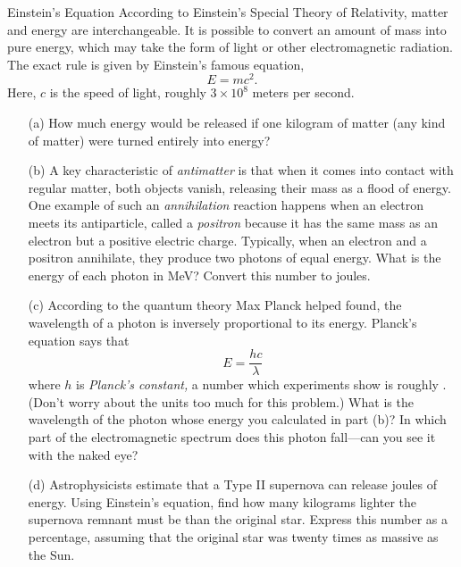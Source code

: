 \documentclass[12pt]{article}
\begin{document}
\begin{probdesc}{8}{Einstein's Equation}
According to Einstein's Special Theory of Relativity, matter and
energy are interchangeable.  It is possible to convert an amount of
mass into pure energy, which may take the form of light or other
electromagnetic radiation.  The exact rule is given by Einstein's
famous equation,
\begin{equation}
E = mc^2.
\end{equation}
Here, $c$ is the speed of light, roughly $3\times10^8$ meters per
second.
\begin{enumerate}
\item[(a)] How much energy would be released if one kilogram of matter (any
  kind of matter) were turned entirely into energy?

\item[(b)] A key characteristic of {\em antimatter} is that when it comes
  into contact with regular matter, both objects vanish, releasing
  their mass as a flood of energy.  One example of such an {\em
  annihilation} reaction happens when an electron meets its
  antiparticle, called a {\em positron} because it has the same mass
  as an electron but a positive electric charge.  Typically, when an
  electron and a positron annihilate, they produce two photons of
  equal energy.  What is the energy of each photon in MeV?  Convert
  this number to joules.

\item[(c)] According to the quantum theory Max Planck helped found, the
  wavelength of a photon is inversely proportional to its energy.
  Planck's equation says that
  \begin{equation}
    E = \frac{hc}{\lambda}
  \end{equation}
  where $h$ is {\em Planck's constant,} a number which experiments show
  is roughly .  (Don't worry about the units too much
  for this problem.)  What is the wavelength of the photon whose energy
  you calculated in part (b)?  In which part of the electromagnetic
  spectrum does this photon fall---can you see it with the naked eye?

\item[(d)] Astrophysicists estimate that a Type II supernova can release
  joules of energy.  Using Einstein's equation, find how many
  kilograms lighter the supernova remnant must be than the original
  star.  Express this number as a percentage, assuming that the
  original star was twenty times as massive as the Sun.
\end{enumerate}
\end{probdesc}
\end{document}
